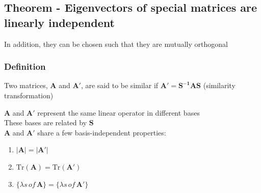 \documentclass[a4paper, 11pt, normalem]{report}
\begin{document}
\subsection{Theorem - Eigenvectors of special matrices are linearly independent}
In addition, they can be chosen such that they are mutually orthogonal
\vspace{-15pt}
\subsubsection{Definition}
Two matrices, $\mathbf{A}$ and $\mathbf{A}'$, are said to be similar if $\mathbf{A}' = \mathbf{S^{-1}AS}$ (similarity transformation)

$\mathbf{A}$ and $\mathbf{A}'$ represent the same linear operator in different bases \\
These bases are related by $\mathbf{S}$ \\
$\mathbf{A}$ and $\mathbf{A}'$ share a few basis-independent properties:
\begin{enumerate}
    \item $\mathbf{|A|} = \mathbf{|A'|}$
    \item $\text{Tr}(\mathbf{A}) = \text{Tr}(\mathbf{A'})$
    \item $\{\lambda s \,of\, \mathbf{A}\} = \{ \lambda s \,of\, \mathbf{A}'\}$
\end{enumerate}
\end{document}
